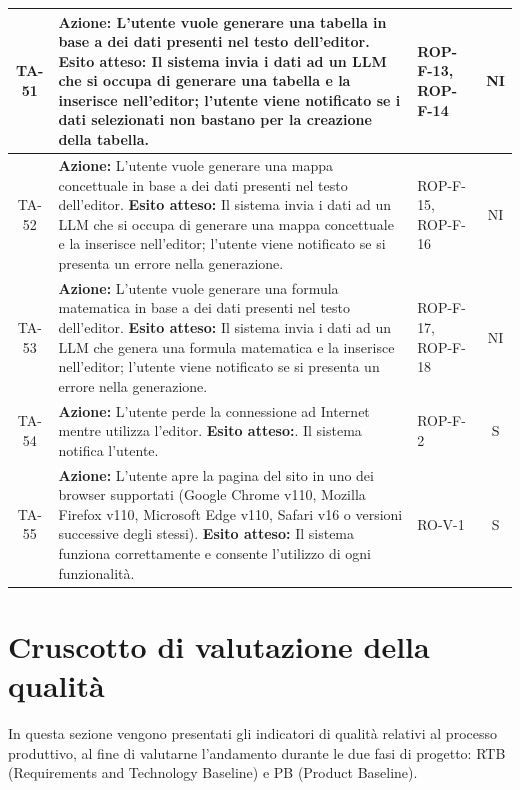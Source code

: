 \documentclass[11pt,a4paper]{article}
\begin{document}
\begin{longtable}{|c|p{9cm}|p{3cm}|c|}
\hline
TA-51 & \textbf{Azione:} L'utente vuole generare una tabella in base a dei dati presenti nel testo dell'editor. \newline \textbf{Esito atteso:} Il sistema invia i dati ad un LLM che si occupa di generare una tabella e la inserisce nell'editor; l'utente viene notificato se i dati selezionati non bastano per la creazione della tabella. & ROP-F-13, ROP-F-14 & NI \\
\hline
TA-52 & \textbf{Azione:} L'utente vuole generare una mappa concettuale in base a dei dati presenti nel testo dell'editor. \newline \textbf{Esito atteso:} Il sistema invia i dati ad un LLM che si occupa di generare una mappa concettuale e la inserisce nell'editor; l'utente viene notificato se si presenta un errore nella generazione. & ROP-F-15, ROP-F-16 & NI \\
\hline
TA-53 & \textbf{Azione:} L'utente vuole generare una formula matematica in base a dei dati presenti nel testo dell'editor. \newline \textbf{Esito atteso:} Il sistema invia i dati ad un LLM che genera una formula matematica e la inserisce nell'editor; l'utente viene notificato se si presenta un errore nella generazione. & ROP-F-17, ROP-F-18 & NI \\
\hline
TA-54 & \textbf{Azione:} L'utente perde la connessione ad Internet mentre utilizza l'editor. \newline \textbf{Esito atteso:}. Il sistema notifica l'utente. & ROP-F-2 & S \\
\hline
TA-55 & \textbf{Azione:} L'utente apre la pagina del sito in uno dei browser supportati (Google Chrome v110, Mozilla Firefox v110, Microsoft Edge v110, Safari v16 o versioni successive degli stessi). \newline \textbf{Esito atteso:} Il sistema funziona correttamente e consente l'utilizzo di ogni funzionalità. & RO-V-1 & S \\
\hline

\end{longtable}

\newpage

\section{Cruscotto di valutazione della qualità}
In questa sezione vengono presentati gli indicatori di qualità relativi al processo produttivo, al fine di valutarne l'andamento durante le due fasi di progetto: RTB (Requirements and Technology Baseline) e PB (Product Baseline).
\end{document}
